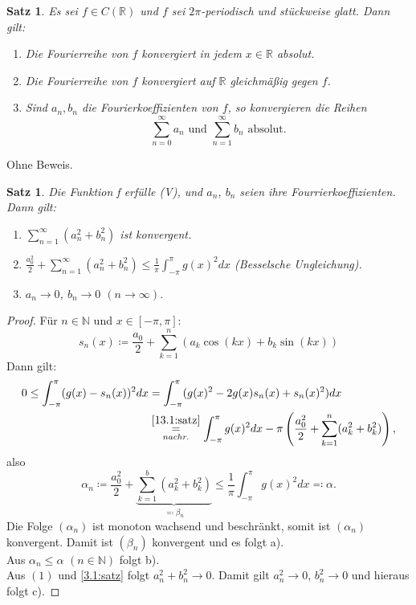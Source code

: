 \documentclass[12pt]{extreport} %
\newcommand{\N}{\mathbb{N}}
\newcommand{\R}{\mathbb{R}}
\theoremstyle{named}
\theoremstyle{itshape}
\newtheorem{satz}[unnamedtheorem]{Satz}
\theoremstyle{normal}
\begin{document}
{\begin{satz} \label{13.6:satz}
	Es sei $f \in C(\R)$ und $f$ sei $2\pi$-periodisch und stückweise glatt. Dann gilt:
	\begin{enumerate}
		\item Die Fourierreihe von $f$ konvergiert in jedem $x \in \R$ absolut.
		\item Die Fourierreihe von $f$ konvergiert auf $\R$ gleichmä{\ss}ig gegen $f$.
		\item Sind $a_{n}, b_{n}$ die Fourierkoeffizienten von $f$, so konvergieren die Reihen
			$$ \sum_{n=0}^{\infty} a_{n} \text{ und } \sum_{n=1}^{\infty} b_{n} \text{ absolut}.$$
			
	\end{enumerate}	
\end{satz}
Ohne Beweis.

\begin{satz} \label{13.7:satz}
	Die Funktion f erfülle (V), und $a_{n}$, $b_{n}$ seien ihre Fourrierkoeffizienten. Dann gilt:
	\begin{enumerate}
		\item $\sum_{n=1}^{\infty} (a_{n}^{2} + b_{n}^{2})$ ist konvergent. \label{13.7.a:satz}
		\item $\frac{a_{0}^{2}}{2} + \sum_{n=1}^{\infty} (a_{n}^{2} + b_{n}^{2}) \leq  \frac{1}{\pi} \int_{-\pi}^{\pi} g(x)^{2} dx$ (Besselsche Ungleichung). \label{13.7.b:satz}
		\item $a_{n} \rightarrow 0$, $b_{n} \rightarrow 0$ $(n \to \infty)$. \label{13.7.c:satz}
	\end{enumerate}	
\end{satz}

\begin{proof}
	Für $n \in \N$ und $x \in [-\pi, \pi]$:
		$$ s_{n}(x) \coloneqq \frac{a_{0}}{2} + \sum_{k=1}^{n} (a_{k} \cos(kx) + b_{k} \sin(kx)) $$
	Dann gilt: 
	\begin{align*}
		0 \leq \int_{-\pi}^{\pi} (g(x) - s_{n}(x))^{2} dx & = \int_{-\pi}^{\pi} (g(x)^{2} - 2g(x) s_{n}(x) + s_{n}(x)^{2} ) dx \\
		  & \overset{\ref{13.1:satz}}{\underset{nachr.}{=}} \int_{-\pi}^{\pi} g(x)^{2} dx - \pi \left( \frac{a_{0}^{2}}{2} + \sum_{k=1}^{n} ( a_{k}^{2} + b_{k}^{2}) \right),
	\end{align*}
	also
	$$ \alpha_{n} \coloneqq \frac{a_{0}^{2}}{2} + \underbrace{\sum_{k=1}^{b}(a_{k}^{2} + b_{k}^{2})}_{\eqqcolon \beta_{n}} 
	\leq \frac{1}{\pi} \int_{-\pi}^{\pi} g(x)^{2} dx \eqqcolon \alpha.$$
	Die Folge $(\alpha_{n})$ ist monoton wachsend und beschränkt, somit ist $(\alpha_{n})$ konvergent. Damit ist $(\beta_{n})$ konvergent und es folgt a). \\
	Aus $\alpha_{n} \leq \alpha$ $(n \in \N)$ folgt b). \\
	Aus $(1)$ und \ref{3.1:satz} folgt $a_{n}^{2} + b_{n}^{2} \rightarrow 0$. Damit gilt $a_{n}^{2} \rightarrow 0$, $b_{n}^2 \rightarrow 0$ und hieraus folgt c).
\end{proof}
\newpage

}
\end{document}
